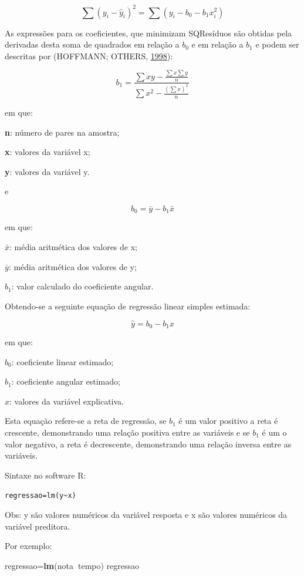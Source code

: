 \documentclass[12pt,brazil,]{book}
\newenvironment{Shaded}{\begin{snugshade}}{\end{snugshade}}
\newcommand{\KeywordTok}[1]{\textcolor[rgb]{0.13,0.29,0.53}{\textbf{#1}}}
\newcommand{\NormalTok}[1]{#1}
\newcommand{\OperatorTok}[1]{\textcolor[rgb]{0.81,0.36,0.00}{\textbf{#1}}}
\begin{document}
\[
\sum (y_i-\hat y_i)^2=\sum (y_i-b_0-b_1x_i^2)
\]

As expressões para os coeficientes, que minimizam SQResíduos são obtidas
pela derivadas desta soma de quadrados em relação a \(b_0\) e em relação
a \(b_1\) e podem ser descritas por (HOFFMANN; OTHERS,
\protect\hyperlink{ref-hoffmann1998}{1998}):

\[
b_1=\frac{\sum xy-\frac{\sum x \sum y}{n}}{\sum x^2 - \frac{(\sum x)^2}{n}}
\]

em que:

\textbf{n}: número de pares na amostra;

\textbf{x}: valores da variável x;

\textbf{y}: valores da variável y.

e

\[
b_0=\bar{y}-b_1\bar{x}
\]

em que:

\(\bar{x}\): média aritmética dos valores de x;

\(\bar{y}\): média aritmética dos valores de y;

\(b_1\): valor calculado do coeficiente angular.

Obtendo-se a seguinte equação de regressão linear simples estimada:

\[
\hat{y}=b_0-b_1{x}
\]

em que:

\(b_0\): coeficiente linear estimado;

\(b_1\): coeficiente angular estimado;

\(x\): valores da variável explicativa.

Esta equação refere-se a reta de regressão, se \(b_1\) é um valor
positivo a reta é crescente, demonstrando uma relação positiva entre as
variáveis e se \(b_1\) é um o valor negativo, a reta é decrescente,
demonstrando uma relação inversa entre as variáveis.

Sintaxe no software R:

\texttt{regressao=lm(y\textasciitilde{}x)}

Obs: y são valores numéricos da variável resposta e x são valores
numéricos da variável preditora.

Por exemplo:

\begin{Shaded}
\begin{Highlighting}[]
\NormalTok{regressao=}\KeywordTok{lm}\NormalTok{(nota}\OperatorTok{~}\NormalTok{tempo)}
\NormalTok{regressao}
\end{Highlighting}
\end{Shaded}
\end{document}
